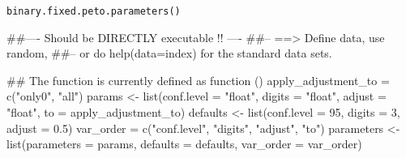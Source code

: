 \begin{Usage}
\begin{verbatim}
binary.fixed.peto.parameters()
\end{verbatim}
\end{Usage}
\begin{Examples}
\begin{ExampleCode}
##---- Should be DIRECTLY executable !! ----
##-- ==>  Define data, use random,
##--    or do  help(data=index)  for the standard data sets.

## The function is currently defined as
function () 
{
    apply_adjustment_to = c("only0", "all")
    params <- list(conf.level = "float", digits = "float", adjust = "float", 
        to = apply_adjustment_to)
    defaults <- list(conf.level = 95, digits = 3, adjust = 0.5)
    var_order = c("conf.level", "digits", "adjust", "to")
    parameters <- list(parameters = params, defaults = defaults, 
        var_order = var_order)
  }
\end{ExampleCode}
\end{Examples}

